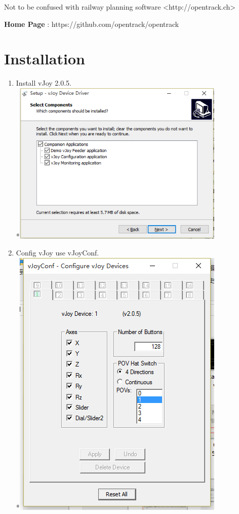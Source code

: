 \documentclass[12pt,a4paper]{article}
\begin{document}
\begin{CJK}{UTF8}{gbsn}
Not to be confused with railway planning software <http://opentrack.ch>


\textbf{Home Page} : https://github.com/opentrack/opentrack
\newpage
\section{Installation}
\begin{enumerate}
\item Install vJoy 2.0.5.
\\*\includegraphics[width=4in]{install_vjoy.png}
\item Config vJoy use vJoyConf.
\\*\includegraphics[width=4in]{install_config_vjoy.png}

\end{enumerate}
\end{CJK}
\end{document}
